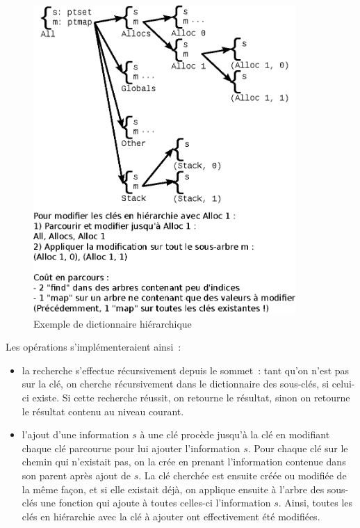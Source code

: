 \documentclass{article}
\begin{document}
\begin{figure}[ht]
\begin{center}
\includegraphics[width=10cm]{alternate_map.eps}
\end{center}
\caption{Exemple de dictionnaire hiérarchique}
\label{alternate_map}
\end{figure}

Les opérations s'implémenteraient ainsi~:

\begin{itemize}

\item la recherche s'effectue récursivement depuis le sommet~: tant qu'on n'est
pas sur la clé, on cherche récursivement dans le dictionnaire des sous-clés, si
celui-ci existe. Si cette recherche réussit, on retourne le résultat, sinon on
retourne le résultat contenu au niveau courant.

\item l'ajout d'une information $s$ à une clé procède jusqu'à la
clé en modifiant chaque clé parcourue pour lui ajouter l'information
$s$. Pour chaque clé sur le chemin qui n'existait pas, on la crée
en prenant l'information contenue dans son parent après ajout de
$s$. La clé cherchée est ensuite créée ou modifiée de la même
façon, et si elle existait déjà, on applique ensuite à l'arbre des sous-clés
une fonction qui ajoute à toutes celles-ci l'information $s$.
Ainsi, toutes les clés en hiérarchie avec la clé à ajouter ont effectivement
été modifiées.

\end{itemize}
\end{document}
